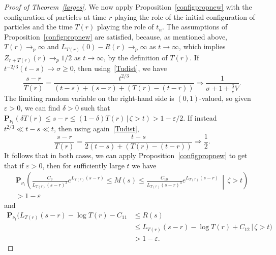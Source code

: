 \documentclass[AHL,Unicode,longabstracts,published]{cedram}
\newcommand*\eps{\varepsilon}
\renewcommand*\P{\mathbf{P}}
\newcommand{\1} {\mathds{1}}
\renewcommand*\to{\rightarrow}
\begin{document}
\begin{proof}[Proof of Theorem~\ref{larges}]
We now apply Proposition~\ref{configpropnew} with the configuration of particles at time $r$ playing the role of the initial configuration of particles and the time $T(r)$ playing the role of $t_n$. The assumptions of Proposition~\ref{configpropnew} are satisfied, because, as mentioned above, $T(r) \rightarrow_p \infty$ and $L_{T(r)}(0) - R(r) \rightarrow_p \infty$ as $t \rightarrow \infty$, which implies $Z_{r+T(r)}(r) \rightarrow_p 1/2$ as $t\to\infty$, by the definition of $T(r)$. If $t^{-2/3}(t - s) \to \sigma \geq 0$, then using~\eqref{Tudist}, we have
\begin{equation}\label{strat1}
\frac{s - r}{T(r)} = \frac{t^{2/3}}{(t - s) + (s - r) + (T(r) - (t - r))} \Rightarrow \frac{1}{\sigma + 1 + \frac{3}{c}V}.
\end{equation}
The limiting random variable on the right-hand side is $(0,1)$-valued, so given $\eps > 0$, we can find $\delta > 0$ such that $\P_{\nu_t}(\delta T(r) \leq s - r \leq (1 - \delta)T(r) \,|\, \zeta > t) > 1 - \eps/2$. If instead $t^{2/3} \ll t - s \ll t$, then using again~\eqref{Tudist},
\begin{equation}\label{strat2}
\frac{s - r}{T(r)} = \frac{t - s}{2(t - s) + (T(r) - (t - r))} \Rightarrow \frac{1}{2}.
\end{equation}
It follows that in both cases, we can apply Proposition~\ref{configpropnew} to get that if $\eps > 0$, then for sufficiently large $t$ we have
\begin{multline}\label{Me1}
\P_{\nu_t} \left(\frac{C_{9}}{L_{T(r)}(s-r)^3} e^{L_{T(r)}(s-r)} \leq M(s) \leq \frac{C_{10}}{L_{T(r)}(s-r)^3} e^{L_{T(r)}(s-r)} \,\middle|\, \zeta > t \right)\\
 > 1 - \eps
\end{multline}
and
\begin{equation}\label{Re1}
\begin{split}
\P_{\nu_t} \big(L_{T(r)}(s-r) - \log T(r) - C_{11} &\leq R(s)\\
&\leq L_{T(r)}(s-r) - \log T(r) + C_{12} \,\big|\, \zeta > t \big)\\
 &> 1 - \eps.
 \end{split}
\end{equation}


\end{proof}
\end{document}
